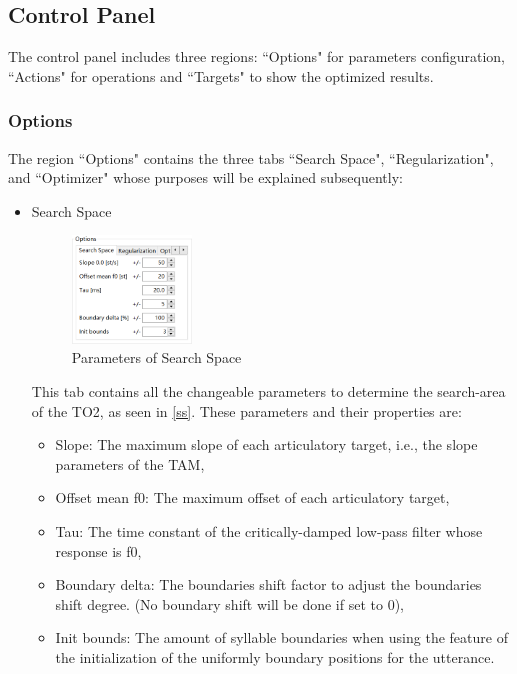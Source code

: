 \subsection*{Control Panel}
The control panel includes three regions: ``Options" for parameters configuration, ``Actions" for operations and ``Targets" to show the optimized results. 

\subsubsection*{ Options}

\parindent3mm The region ``Options" contains the three tabs ``Search Space", ``Regularization", and ``Optimizer" whose purposes will be explained subsequently:

\begin{itemize}
	\item Search Space
	\begin{figure}[H]
	\centering
	\includegraphics[width=0.3\textwidth]{images/search space.png}
	\caption{Parameters of Search Space}
	\label{ss}
	\end{figure}
	This tab contains all the changeable parameters to determine the search-area of the TO2, as seen in \autoref{ss}. These parameters and their properties are:
	\begin{itemize}
		\item Slope: The maximum slope of each articulatory target, i.e., the slope parameters of the TAM,
		\item Offset mean f0: The maximum offset of each articulatory target,
		\item Tau: The time constant of the critically-damped low-pass filter whose response is f0,
		\item Boundary delta: The boundaries shift factor to adjust the boundaries shift degree. (No boundary shift will be done if set to 0),
		\item Init bounds: The amount of syllable boundaries when using the feature of the initialization of the uniformly boundary positions for the utterance.
	\end{itemize}
	

\end{itemize}
